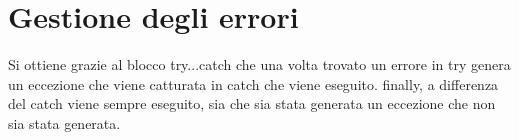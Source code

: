\chapter{Gestione degli errori}
Si ottiene grazie al blocco try...catch che una volta trovato un errore in try genera un eccezione che viene catturata in catch che viene eseguito. finally, a differenza
del catch viene sempre eseguito, sia che sia stata generata un eccezione che non sia stata generata.